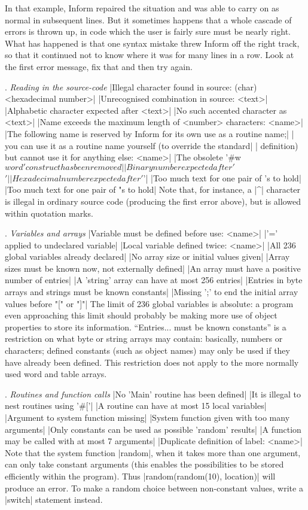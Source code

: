 In that example, Inform repaired the situation and was able to carry on as normal
in subsequent lines.  But it sometimes happens that a whole cascade of errors
is thrown up, in code which the user is fairly sure must be nearly right.  What
has happened is that one syntax mistake threw Inform off the right track, so that
it continued not to know where it was for many lines in a row.  Look at the first
error message, fix that and then try again.

\medskip{}. {\sl Reading in the source-code}
\beginlines
|Illegal character found in source: (char) <hexadecimal number>|
|Unrecognised combination in source: <text>|
|Alphabetic character expected after <text>|
|No such accented character as <text>|
|Name exceeds the maximum length of <number> characters: <name>|
|The following name is reserved by Inform for its own use as a routine name;|
|    you can use it as a routine name yourself (to override the standard|
|    definition) but cannot use it for anything else: <name>|
|The obsolete '#w$word' construct has been removed|
|Binary number expected after '$$'|
|Hexadecimal number expected after '$'|
|Too much text for one pair of 's to hold|
|Too much text for one pair of "s to hold|
\endlines
Note that, for instance, a |^| character is illegal in ordinary source
code (producing the first error above), but is allowed within quotation
marks.

\medskip{}. {\sl Variables and arrays}
\beginlines
|Variable must be defined before use: <name>|
|'=' applied to undeclared variable|
|Local variable defined twice: <name>|
|All 236 global variables already declared|
|No array size or initial values given|
|Array sizes must be known now, not externally defined|
|An array must have a positive number of entries|
|A 'string' array can have at most 256 entries|
|Entries in byte arrays and strings must be known constants|
|Missing ';' to end the initial array values before "[" or "]"|
\endlines
The limit of 236 global variables is absolute: a program even approaching this
limit should probably be making more use of object properties to store its
information.  ``Entries... must be known constants'' is a restriction on what
byte or string arrays may contain: basically, numbers or characters; defined
constants (such as object names) may only be used if they have already been
defined.  This restriction does not apply to the more normally used word and
table arrays.

\medskip{}. {\sl Routines and function calls}
\beginlines
|No 'Main' routine has been defined|
|It is illegal to nest routines using '#['|
|A routine can have at most 15 local variables|
|Argument to system function missing|
|System function given with too many arguments|
|Only constants can be used as possible 'random' results|
|A function may be called with at most 7 arguments|
|Duplicate definition of label: <name>|
\endlines
Note that the system function |random|, when it takes more than one
argument, can only take constant arguments (this enables the possibilities
to be stored efficiently within the program).  Thus
|random(random(10), location)| will produce an error.  To make a
random choice between non-constant values, write a |switch| statement instead.

